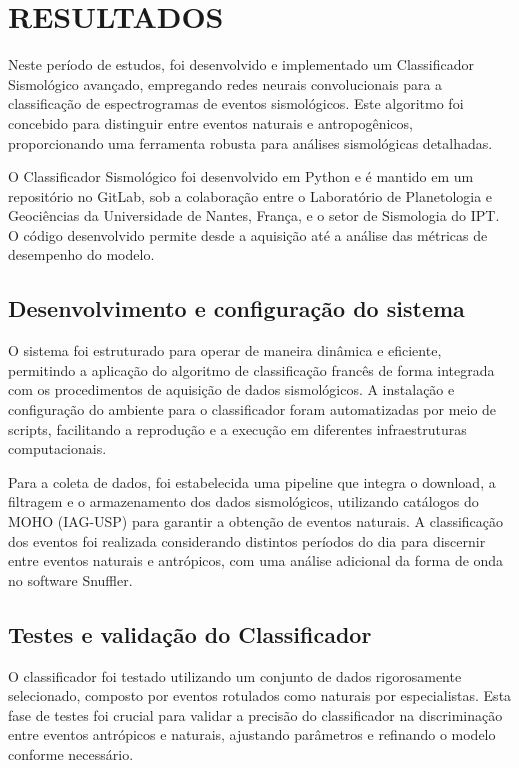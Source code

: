 \section{RESULTADOS}
\label{sec:ativ_real}
\par{Neste período de estudos, foi desenvolvido e implementado um Classificador Sismológico avançado, empregando redes neurais convolucionais para a classificação de espectrogramas de eventos sismológicos. Este algoritmo foi concebido para distinguir entre eventos naturais e antropogênicos, proporcionando uma ferramenta robusta para análises sismológicas detalhadas.}

\par{O Classificador Sismológico foi desenvolvido em Python e é mantido em um repositório no GitLab, sob a colaboração entre o Laboratório de Planetologia e Geociências da Universidade de Nantes, França, e o setor de Sismologia do IPT. O código desenvolvido permite desde a aquisição até a análise das métricas de desempenho do modelo.}

\subsection{Desenvolvimento e configuração do sistema}
\label{subsec:desenvolvimento}
\par{O sistema foi estruturado para operar de maneira dinâmica e eficiente, permitindo a aplicação do algoritmo de classificação francês de forma integrada com os procedimentos de aquisição de dados sismológicos. A instalação e configuração do ambiente para o classificador foram automatizadas por meio de scripts, facilitando a reprodução e a execução em diferentes infraestruturas computacionais.}

\par{Para a coleta de dados, foi estabelecida uma pipeline que integra o download, a filtragem e o armazenamento dos dados sismológicos, utilizando catálogos do MOHO (IAG-USP) para garantir a obtenção de eventos naturais. A classificação dos eventos foi realizada considerando distintos períodos do dia para discernir entre eventos naturais e antrópicos, com uma análise adicional da forma de onda no software Snuffler.}

\subsection{Testes e validação do Classificador}
\label{subsec:testes_validacao}
\par{O classificador foi testado utilizando um conjunto de dados rigorosamente selecionado, composto por eventos rotulados como naturais por especialistas. Esta fase de testes foi crucial para validar a precisão do classificador na discriminação entre eventos antrópicos e naturais, ajustando parâmetros e refinando o modelo conforme necessário.}


